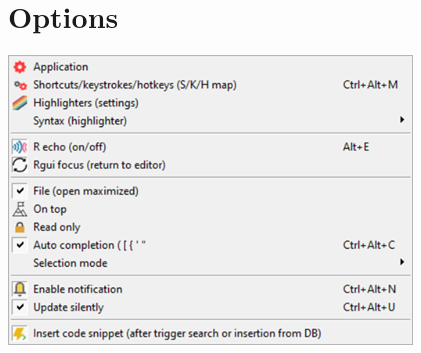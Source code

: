 
\hypertarget{menu_options}{}
\section{Options}

\includegraphics[scale=0.8]{./res/menu_options.png}\\

